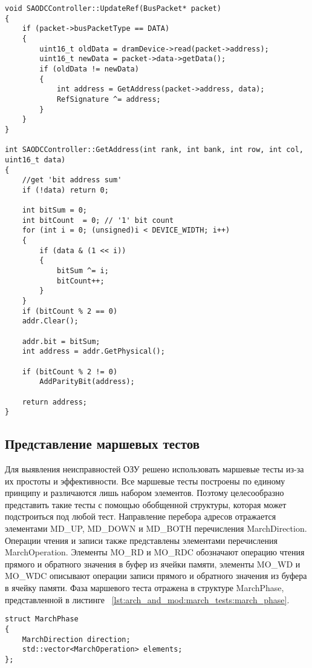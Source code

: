 \begin{lstlisting}[style=cplusplusstyle, caption={Обновление эталонной сигнатуры ОЗУ}, label=lst:arch_and_mod:memory_refresh:update_sig]
void SAODCController::UpdateRef(BusPacket* packet)
{
    if (packet->busPacketType == DATA)
    {
        uint16_t oldData = dramDevice->read(packet->address);
        uint16_t newData = packet->data->getData();
        if (oldData != newData)
        {
            int address = GetAddress(packet->address, data);
            RefSignature ^= address;       
        }
    }
}

int SAODCController::GetAddress(int rank, int bank, int row, int col, uint16_t data)
{
    //get 'bit address sum'
    if (!data) return 0;
    
    int bitSum = 0;
    int bitCount  = 0; // '1' bit count
    for (int i = 0; (unsigned)i < DEVICE_WIDTH; i++)
    {
        if (data & (1 << i))
        {
            bitSum ^= i;
            bitCount++;
        }
    }
    if (bitCount % 2 == 0)
    addr.Clear();
    
    addr.bit = bitSum;
    int address = addr.GetPhysical();

    if (bitCount % 2 != 0)
        AddParityBit(address);
  
    return address;
}
\end{lstlisting} 

\subsection{Представление маршевых тестов}
\label{sub:arch_and_mod:march_tests}

Для выявления неисправностей ОЗУ решено использовать маршевые тесты из-за их простоты и эффективности. Все маршевые тесты построены по единому принципу и различаются лишь набором элементов. Поэтому целесообразно представить такие тесты с помощью обобщенной структуры, которая может подстроиться под любой тест. Направление перебора адресов отражается элементами MD\_UP, MD\_DOWN и MD\_BOTH перечисления MarchDirection. Операции чтения и записи также представлены элементами перечисления MarchOperation. Элементы MO\_RD и MO\_RDC обозначают операцию чтения прямого и обратного значения в буфер из ячейки памяти, элементы MO\_WD и MO\_WDC описывают операции записи прямого и обратного значения из буфера в ячейку памяти. Фаза маршевого теста отражена в структуре MarchPhase, представленной в листинге ~\ref{lst:arch_and_mod:march_tests:march_phase}.

\begin{lstlisting}[style=cplusplusstyle, caption={Структура фазы маршевого теста}, label=lst:arch_and_mod:march_tests:march_phase]
struct MarchPhase
{
    MarchDirection direction;
    std::vector<MarchOperation> elements;
};
\end{lstlisting} 

